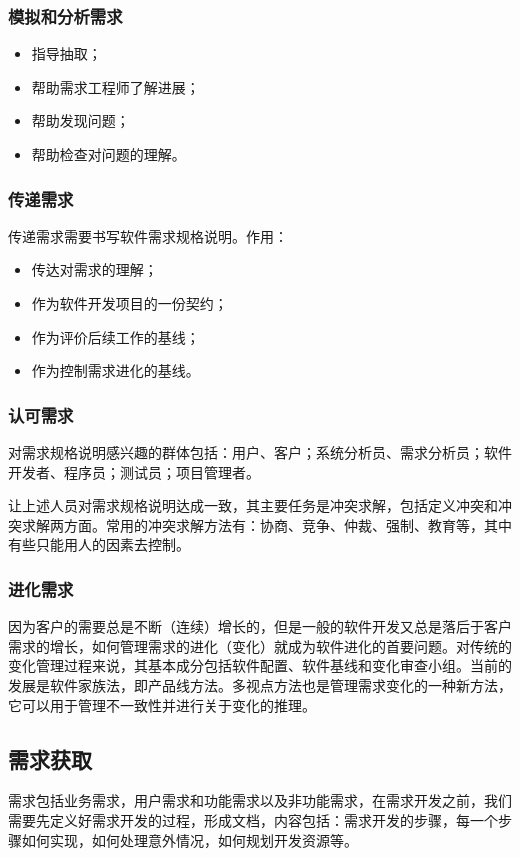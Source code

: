 \documentclass[UTF8,nofonts]{ctexart}
\begin{document}
\subsubsection{\textbf{模拟和分析需求}}
\begin{itemize}
 \setlength{\itemsep}{0pt}
 \setlength{\parskip}{0pt}
 \setlength{\parsep}{0pt}
\item 指导抽取；
\item 帮助需求工程师了解进展；
\item 帮助发现问题；
\item 帮助检查对问题的理解。
\end{itemize}
\subsubsection{\textbf{传递需求}}传递需求需要书写软件需求规格说明。作用：
\begin{itemize}
 \setlength{\itemsep}{0pt}
 \setlength{\parskip}{0pt}
 \setlength{\parsep}{0pt}
\item 传达对需求的理解；
\item 作为软件开发项目的一份契约；
\item 作为评价后续工作的基线；
\item 作为控制需求进化的基线。
\end{itemize}
\subsubsection{\textbf{认可需求}}
对需求规格说明感兴趣的群体包括：用户、客户；系统分析员、需求分析员；软件开发者、程序员；测试员；项目管理者。

让上述人员对需求规格说明达成一致，其主要任务是冲突求解，包括定义冲突和冲突求解两方面。常用的冲突求解方法有：协商、竞争、仲裁、强制、教育等，其中有些只能用人的因素去控制。
\subsubsection{\textbf{进化需求}}
因为客户的需要总是不断（连续）增长的，但是一般的软件开发又总是落后于客户需求的增长，如何管理需求的进化（变化）就成为软件进化的首要问题。对传统的变化管理过程来说，其基本成分包括软件配置、软件基线和变化审查小组。当前的发展是软件家族法，即产品线方法。多视点方法也是管理需求变化的一种新方法，它可以用于管理不一致性并进行关于变化的推理。
\subsection{\textbf{需求获取}}
	需求包括业务需求，用户需求和功能需求以及非功能需求，在需求开发之前，我们需要先定义好需求开发的过程，形成文档，内容包括：需求开发的步骤，每一个步骤如何实现，如何处理意外情况，如何规划开发资源等。
	
\end{document}
